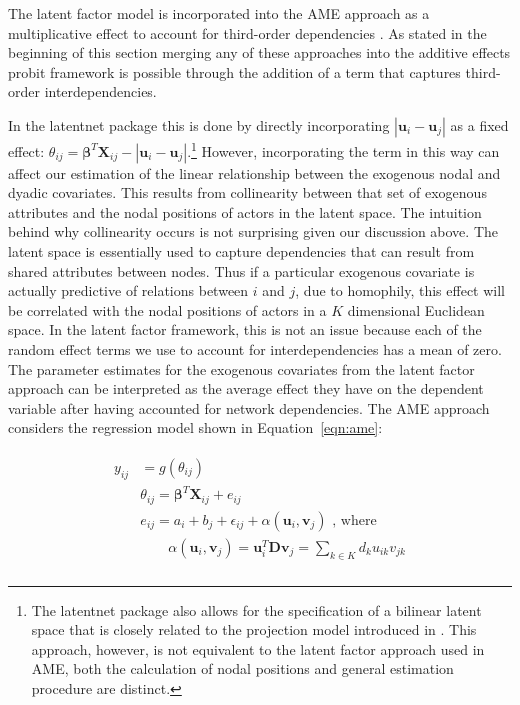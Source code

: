 \documentclass[12pt,onesided,pdflatex]{amsart}
\newcommand{\pkg}[1]{{\fontseries{b}\selectfont #1}}
\begin{document}
The latent factor model is incorporated into the AME approach as a multiplicative effect to account for third-order dependencies \citep{hoff:2009,hoff:etal:2015}. As stated in the beginning of this section merging any of these approaches into the additive effects probit framework is possible through the addition of a term that captures third-order interdependencies. 

In the \pkg{latentnet} package this is done by directly incorporating $|\textbf{u}_{i} - \textbf{u}_{j}|$ as a fixed effect: $\theta_{ij} = \bm\beta^{T} \mathbf{X}_{ij} - |\textbf{u}_{i} - \textbf{u}_{j}|$.\footnote{The \pkg{latentnet} package also allows for the specification of a bilinear latent space that is closely related to the projection model introduced in \citet{hoff:etal:2002}. This approach, however, is not equivalent to the latent factor approach used in AME, both the calculation of nodal positions and general estimation procedure are distinct.} However, incorporating the term in this way can affect our estimation of the linear relationship between the exogenous nodal and dyadic covariates. This results from collinearity between that set of exogenous attributes and the nodal positions of actors in the latent space. The intuition behind why collinearity occurs is not surprising given our discussion above. The latent space is essentially used to capture dependencies that can result from shared attributes between nodes. Thus if a particular exogenous covariate is actually predictive of relations between $i$ and $j$, due to homophily, this effect will be correlated with the nodal positions of actors in a $K$ dimensional Euclidean space. In the latent factor framework, this is not an issue because each of the random effect terms we use to account for interdependencies has a mean of zero. The parameter estimates for the exogenous covariates from the latent factor approach can be interpreted as the average effect they have on the dependent variable after having accounted for network dependencies. The AME approach considers the regression model shown in Equation~\ref{eqn:ame}:

\begin{align}
\begin{aligned}
	y_{ij} &= g(\theta_{ij}) \\ 
	&\theta_{ij} = \bm\beta^{T} \mathbf{X}_{ij} + e_{ij} \\
	&e_{ij} = a_{i} + b_{j}  + \epsilon_{ij} + \alpha(\textbf{u}_{i}, \textbf{v}_{j}) \text{  , where } \\
	&\qquad \alpha(\textbf{u}_{i}, \textbf{v}_{j}) = \textbf{u}_{i}^{T} \textbf{D} \textbf{v}_{j} = \sum_{k \in K} d_{k} u_{ik} v_{jk} \\ 
\label{eqn:ame}
\end{aligned}
\end{align}
\end{document}
